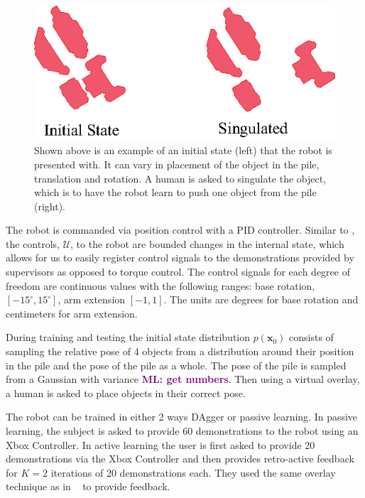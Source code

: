 \documentclass[10pt, conference]{ieeeconf}      %
\newcommand{\bx}{\mathbf{x}}
\newcommand{\mlnote}[1]{%
 {\textcolor{purple}{\textbf{ML: #1}}}{}}
\begin{document}
\begin{figure}
\centering
\includegraphics{f_figs/singulation.eps}
\caption{
    \footnotesize
Shown above is an example of an initial state (left) that the robot is presented with. It can vary in placement of the object in the pile, translation and rotation. A human is asked to singulate the object, which is to have the robot learn to push one object from the pile (right).  }

\label{fig:izzy_rw}
\end{figure}

The robot is commanded via position 
control with a  PID controller. Similar to \cite{laskeyshiv}, the controls, $\mathcal{U}$, to the robot are bounded changes in the internal state, which allows for us to easily register control signals to the demonstrations provided by supervisors as opposed to torque control. The control signals for each degree of freedom are continuous values with the following ranges: base rotation, $[-15^\circ,15^\circ]$, arm extension $[-1,1]$. The units are degrees for base rotation and centimeters for arm extension. 

During training and testing the initial state distribution $p(\bx_0)$ consists of sampling the relative pose of 4 objects from a distribution around their position in the pile and the pose of the pile as a whole. The pose of the pile is sampled from a Gaussian with variance \mlnote{get numbers}. Then using a virtual overlay,  a human is asked to place objects in their correct pose. 

The robot can be trained in either 2 ways DAgger or passive learning. In passive learning, the subject is asked to provide 60 demonstrations to the robot using an Xbox Controller. In active learning the user is first asked to provide 20 demonstrations via the Xbox Controller and then provides retro-active feedback for $K=2$ iterations of 20 demonstrations each. They used the same overlay technique as in ~\cite{laskeyrobot} to provide feedback. 
\end{document}
